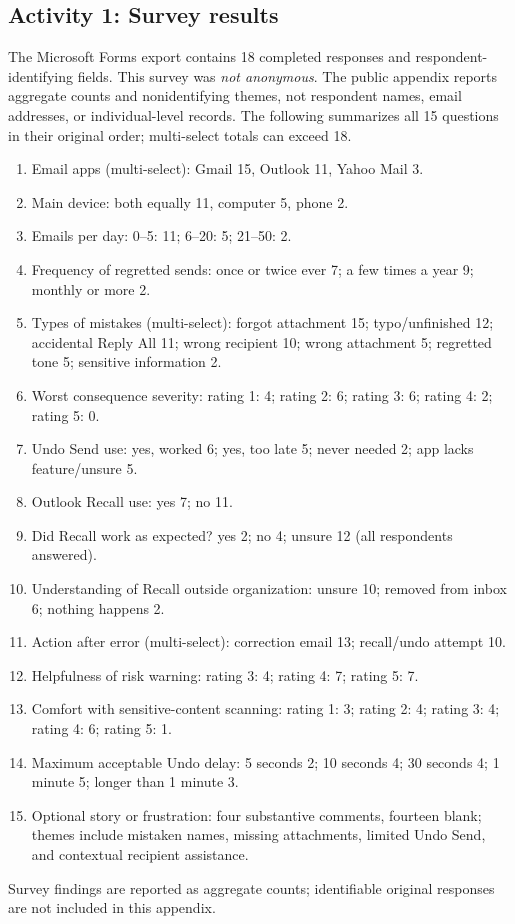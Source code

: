 \documentclass[letterpaper]{jdf}
\begin{document}
\subsection{Activity 1: Survey results}\label{app:needfinding-survey}

The Microsoft Forms export contains 18 completed responses and respondent-identifying fields. This survey was \emph{not anonymous}. The public appendix reports aggregate counts and nonidentifying themes, not respondent names, email addresses, or individual-level records. The following summarizes all 15 questions in their original order; multi-select totals can exceed 18.
\begin{enumerate}
\item Email apps (multi-select): Gmail 15, Outlook 11, Yahoo Mail 3.
\item Main device: both equally 11, computer 5, phone 2.
\item Emails per day: 0--5: 11; 6--20: 5; 21--50: 2.
\item Frequency of regretted sends: once or twice ever 7; a few times a year 9; monthly or more 2.
\item Types of mistakes (multi-select): forgot attachment 15; typo/unfinished 12; accidental Reply All 11; wrong recipient 10; wrong attachment 5; regretted tone 5; sensitive information 2.
\item Worst consequence severity: rating 1: 4; rating 2: 6; rating 3: 6; rating 4: 2; rating 5: 0.
\item Undo Send use: yes, worked 6; yes, too late 5; never needed 2; app lacks feature/unsure 5.
\item Outlook Recall use: yes 7; no 11.
\item Did Recall work as expected? yes 2; no 4; unsure 12 (all respondents answered).
\item Understanding of Recall outside organization: unsure 10; removed from inbox 6; nothing happens 2.
\item Action after error (multi-select): correction email 13; recall/undo attempt 10.
\item Helpfulness of risk warning: rating 3: 4; rating 4: 7; rating 5: 7.
\item Comfort with sensitive-content scanning: rating 1: 3; rating 2: 4; rating 3: 4; rating 4: 6; rating 5: 1.
\item Maximum acceptable Undo delay: 5 seconds 2; 10 seconds 4; 30 seconds 4; 1 minute 5; longer than 1 minute 3.
\item Optional story or frustration: four substantive comments, fourteen blank; themes include mistaken names, missing attachments, limited Undo Send, and contextual recipient assistance.
\end{enumerate}
Survey findings are reported as aggregate counts; identifiable original responses are not included in this appendix.
\end{document}
